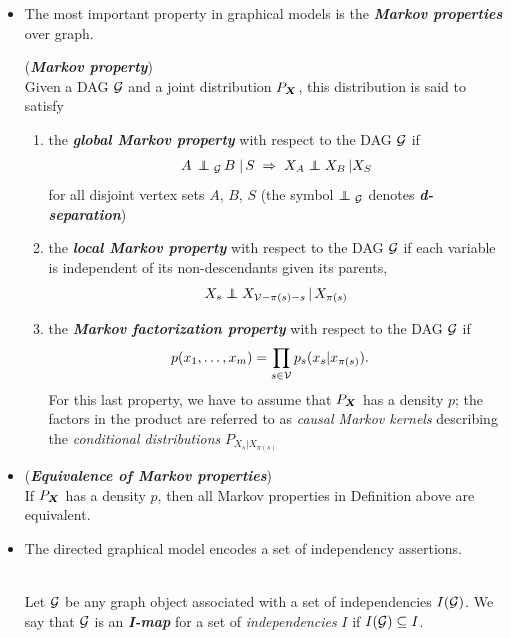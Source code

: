 \documentclass[11pt]{article}
\begin{document}
\begin{itemize}
\item The most important property in graphical models is the \textbf{\emph{Markov properties}} over graph. 
\begin{definition}(\textbf{\emph{Markov property}}) \citep{peters2017elements}\\
Given a DAG ${\mathcal G}$ and a joint distribution $P_{\boldsymbol{X}}$, this distribution is said to satisfy
\begin{enumerate}
\item the \textbf{\emph{global Markov property}} with respect to the DAG ${\mathcal G}$ if
\begin{align}
A \,\indep_{\cG} \, B \;|\, S \; \Rightarrow \; X_{A} \indep X_{B} \,| X_{S}
\end{align} for all disjoint vertex sets $A$, $B$, $S$ (the symbol $\indep_{\cG}$ denotes \textbf{\emph{d-separation}})

\item the \textbf{\emph{local Markov property}} with respect to the DAG ${\mathcal G}$ if each variable is
independent of its non-descendants given its parents, 
\begin{align*}
X_{s} \indep X_{\cV - \pi(s) - s}  \,|\, X_{\pi(s)}
\end{align*}

\item the \textbf{\emph{Markov factorization property}} with respect to the DAG ${\mathcal G}$ if
\begin{align*}
p(x_1, \ldots, x_{m}) &= \prod_{s \in {\mathcal V}}p_s(x_s | x_{\pi(s)}).
\end{align*} For this last property, we have to assume that $P_{\boldsymbol{X}}$ has a density $p$; the factors in the product are referred to as \emph{causal Markov kernels} describing the \emph{conditional distributions} $P_{X_{s} | X_{\pi(s)}}$
\end{enumerate}
\end{definition}

\item \begin{theorem} (\emph{\textbf{Equivalence of Markov properties}})\citep{peters2017elements}\\
If $P_{\boldsymbol{X}}$ has a density $p$, then all Markov properties in Definition above are equivalent.
\end{theorem}



\item The directed graphical model encodes a set of independency assertions. 
\begin{definition} \citep{koller2009probabilistic}\\
 Let ${\mathcal G}$ be any graph object associated with a set of independencies $I({\mathcal G})$. We say that ${\mathcal G}$ is an \emph{\textbf{I-map}} for a set of \emph{independencies} $I$ if $I({\mathcal G})\subseteq I$.
\end{definition}


\end{itemize}
\end{document}
